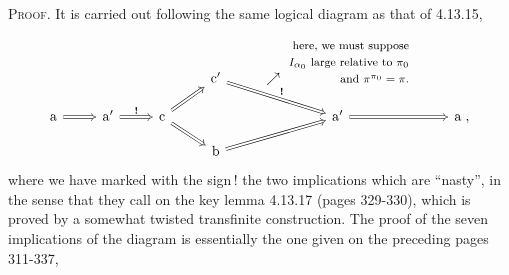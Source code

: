 \textsc{Proof}. It is carried out following the same logical diagram as that of 4.13.15,
\[
\begin{tikzcd}[row sep=small]
& & & \mathrm{c}' \arrow[dr, Rightarrow, "\textbf{!}"] & \nearrow\ \begin{tabular}[b]{@{}r@{}}\footnotesize here, we must suppose\\ \footnotesize $I_{\alpha_0}$ large relative to $\pi_0$\\ \footnotesize and $\pi^{\pi_0} = \pi$.\end{tabular} & \\
\mathrm{a} \arrow[r, Rightarrow] & \mathrm{a}' \arrow[r, Rightarrow, "\textbf{!}"] & \mathrm{c} \arrow[ur, Rightarrow] \arrow[dr, Rightarrow] & & \mathrm{a}' \arrow[r, Rightarrow] & \mathrm{a} \; , \\
& & & \mathrm{b} \arrow[ur, Rightarrow] & &
\end{tikzcd}
\]
where we have marked with the sign\,! the two implications which are ``nasty'', in the sense that they call on the key lemma 4.13.17 (pages 329-330), which is proved by a somewhat twisted transfinite construction. The proof of the seven implications of the diagram is essentially
the one given on the preceding pages 311-337, %